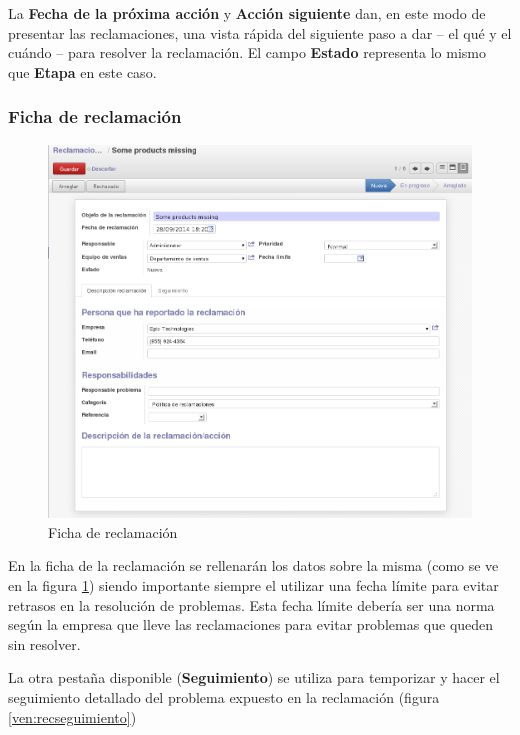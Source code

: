 La \textbf{Fecha de la próxima acción} y \textbf{Acción siguiente} dan, en este modo de presentar las reclamaciones, una vista rápida del siguiente paso a dar -- el qué y el cuándo -- para resolver la reclamación. El campo \textbf{Estado} representa lo mismo que \textbf{Etapa} en este caso.

\subsubsection{Ficha de reclamación}

\begin{figure}[H]
\includegraphics[width=\textwidth]{ventas/img/ven_recindividual.png}
\caption{Ficha de reclamación}
\label{ven:recindividual}
\end{figure}

En la ficha de la reclamación se rellenarán los datos sobre la misma (como se ve en la figura \ref{ven:recindividual}) siendo importante siempre
el utilizar una fecha límite para evitar retrasos en la resolución de problemas. Esta fecha límite debería ser una norma según la empresa que lleve las reclamaciones para evitar problemas que queden sin resolver.

La otra pestaña disponible (\textbf{Seguimiento}) se utiliza para temporizar y hacer el seguimiento detallado del problema expuesto en la
reclamación (figura \ref{ven:recseguimiento})

